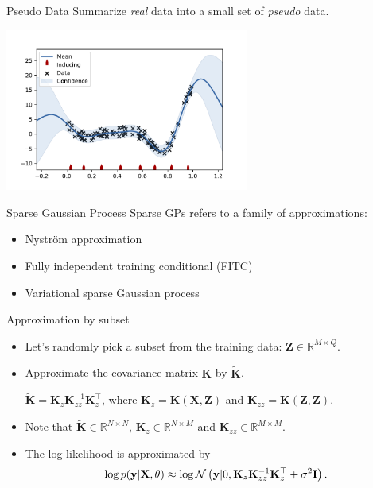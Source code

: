 \documentclass[14pt,aspectratio=1610]{beamer}
\newcommand{\yV}{\mathbf{y}}
\newcommand{\xM}{\mathbf{X}}
\newcommand{\K}{\mathbf{K}}
\newcommand{\R}{\mathbb{R}}
\newcommand{\zM}{\mathbf{Z}}
\newcommand{\I}{\mathbf{I}}
\begin{document}
\begin{frame}{Pseudo Data}
Summarize \textit{real} data into a small set of \textit{pseudo} data.
\begin{center}
\includegraphics[width=0.6\textwidth]{sparsegp_example_lots_data.pdf} 
\end{center}
\end{frame}

\begin{frame}{Sparse Gaussian Process}
Sparse GPs refers to a family of approximations:
\begin{itemize}
\item Nystr\"{o}m approximation \citep{WilliamsSeeger2001}
\item Fully independent training conditional (FITC) \citep{SnelsonZoubin2006}
\item Variational sparse Gaussian process \citep{Titsias2009}
\end{itemize}
\end{frame}

\begin{frame}{Approximation by subset}
\begin{itemize}
\item Let's randomly pick a subset from the training data: $\zM \in \R^{M\times Q}$.
\item Approximate the covariance matrix $\K$ by $\tilde{\K}$.
\vspace{5mm}

$\tilde{\K} = \K_z \K_{zz}^{-1} \K_z^\top$, where $\K_{z} = \K(\xM, \zM)$ and $\K_{zz} = \K(\zM, \zM)$.
\vspace{5mm}
\item Note that $\tilde{\K} \in \R^{N\times N}$, $\K_{z} \in \R^{N\times M}$ and $\K_{zz} \in \R^{M \times M}$.
\item The log-likelihood is approximated by 
\[
\log p(\yV|\xM, \theta) \approx  \log \gaussianDist{\yV}{0}{\K_z \K_{zz}^{-1} \K_z^\top+\sigma^2\I}.
\]
\end{itemize}
\end{frame}
\end{document}
